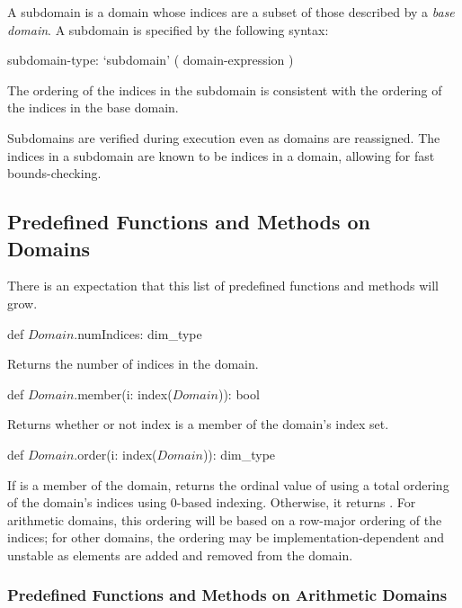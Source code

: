 A subdomain is a domain whose indices are a subset of those described
by a \emph{base domain}.  A subdomain is specified by the following
syntax:
\begin{syntax}
subdomain-type:
  `subdomain' ( domain-expression )
\end{syntax}
The ordering of the indices in the subdomain is consistent with the
ordering of the indices in the base domain.

Subdomains are verified during execution even as domains are
reassigned.  The indices in a subdomain are known to be indices in a
domain, allowing for fast bounds-checking.

\subsection{Predefined Functions and Methods on Domains}

There is an expectation that this list of predefined functions and
methods will grow.

\begin{protohead}
def $Domain$.numIndices: dim_type
\end{protohead}
\begin{protobody}
Returns the number of indices in the domain.
\end{protobody}

\begin{protohead}
def $Domain$.member(i: index($Domain$)): bool
\end{protohead}
\begin{protobody}
Returns whether or not index  is a member of the domain's
index set.
\end{protobody}

\begin{protohead}
def $Domain$.order(i: index($Domain$)): dim_type
\end{protohead}
\begin{protobody}
If  is a member of the domain, returns the ordinal value of
 using a total ordering of the domain's indices using 0-based
indexing.  Otherwise, it returns .  For arithmetic
domains, this ordering will be based on a row-major ordering of the
indices; for other domains, the ordering may be
implementation-dependent and unstable as elements are added and
removed from the domain.
\end{protobody}


\subsubsection{Predefined Functions and Methods on Arithmetic Domains}

